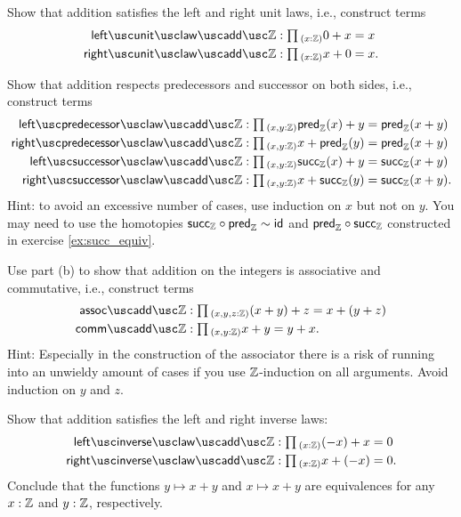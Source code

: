 \begin{exercises}
  \begin{subexenum}
  \item Show that addition satisfies the left and right unit laws, i.e., construct terms
    \begin{align*}
      \leftunitlawaddZ  & : \prd{x:\Z} 0 + x = x \\
      \rightunitlawaddZ  & : \prd{x : \Z} x + 0 = x.
    \end{align*}
  \item Show that addition respects predecessors and successor on both sides, i.e., construct terms
    \begin{align*}
      \leftpredecessorlawaddZ & : \prd{x,y:\Z} \predZ(x)+y = \predZ(x+y) \\
      \rightpredecessorlawaddZ & : \prd{x,y:\Z} x+\predZ(y) = \predZ(x+y) \\
      \leftsuccessorlawaddZ & : \prd{x,y:\Z} \succZ(x)+y = \succZ(x+y) \\
      \rightsuccessorlawaddZ & : \prd{x,y:\Z} x+\succZ(y) = \succZ(x+y).
    \end{align*}
    Hint: to avoid an excessive number of cases, use induction on $x$ but not on $y$. You may need to use the homotopies $\mathsf{succ}_{{\mathbb{Z}}}\circ \mathsf{pred}_{{\mathbb{Z}}}\sim \mathsf{id}_{}$ and $\mathsf{pred}_{{\mathbb{Z}}}\circ\mathsf{succ}_{{\mathbb{Z}}}$ constructed in exercise \cref{ex:succ_equiv}.
  \item Use part (b) to show that addition on the integers is associative and commutative, i.e., construct terms
    \begin{align*}
      \assocaddZ & : \prd{x,y,z:\Z} (x+y)+z = x + (y+z) \\
      \commaddZ & : \prd{x,y:\Z} x+y = y+x.
    \end{align*}
    Hint: Especially in the construction of the associator there is a risk of running into an unwieldy amount of cases if you use ${\mathbb{Z}}$-induction on all arguments. Avoid induction on $y$ and $z$.
  \item Show that addition satisfies the left and right inverse laws:
    \begin{align*}
      \leftinverselawaddZ & : \prd{x : \Z} (-x)+x=0 \\
      \rightinverselawaddZ & : \prd{x : \Z} x + (-x)=0.
    \end{align*}
    Conclude that the functions $y \mapsto x + y$ and $x\mapsto x + y$ are equivalences for any $x:{\mathbb{Z}}$ and $y:{\mathbb{Z}}$, respectively.

\end{subexenum}
\end{exercises}
